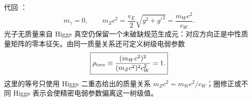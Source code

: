 \begin{corollary}
代回 ：
\begin{equation}
 \boxed{
 m_\gamma=0,
 \qquad
 m_Zc^2=\frac{v_E}{2}\sqrt{g^2+g'^2}
 =\frac{m_Wc^2}{c_W}.}
 \label{eq:sm-z-photon-masses-dp11}
\end{equation}
光子无质量来自 Higgs 真空仍保留一个未破缺规范生成元：对应方向正是中性质量矩阵的零本征矢。由同一质量关系还可定义树级电弱参数
\begin{equation}
 \boxed{
 \rho_{\rm tree}
 \equiv\frac{(m_Wc^2)^2}{(m_Zc^2)^2c_W^2}=1.}
 \label{eq:sm-rho-tree-dp85}
\end{equation}
这里的等号只使用 Higgs 二重态给出的质量关系 $m_Zc^2=m_Wc^2/c_W$；圈修正或不同 Higgs 表示会使精密电弱参数偏离这一树级值。
\end{corollary}

